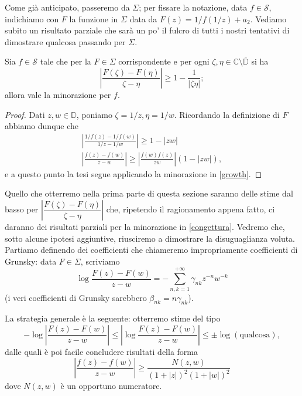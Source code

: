 Come già anticipato, passeremo da $\Sigma$; per fissare la notazione, data $f \in \mathcal{S}$, indichiamo con $F$ la funzione in $\Sigma$ data da $F(z)=1/f(1/z)+a_2$. Vediamo subito un risultato parziale che sarà un po' il fulcro di tutti i nostri tentativi di dimostrare qualcosa passando per $\Sigma$.

\begin{prop}
  Sia $f \in \mathcal{S}$ tale che per la $F \in \Sigma$ corrispondente e per ogni $\zeta,\eta \in \mathbb{C}\setminus\overline{\mathbb{D}}$ si ha
  $$\left|\frac{F(\zeta)-F(\eta)}{\zeta-\eta}\right| \ge 1-\frac{1}{|\zeta\eta|};$$
  allora vale la minorazione per $f$.
\end{prop}

\begin{proof}
  Dati $z,w \in \mathbb{D}$, poniamo $\zeta=1/z, \eta=1/w$. Ricordando la definizione di $F$ abbiamo dunque che
  \begin{gather*}
    \left|\frac{1/f(z)-1/f(w)}{1/z-1/w}\right| \ge 1-|zw| \\
    \left|\frac{f(z)-f(w)}{z-w}\right| \ge \left|\frac{f(w)f(z)}{zw}\right| (1-|zw|),
  \end{gather*}
  e a questo punto la tesi segue applicando la minorazione in \eqref{growth}.
\end{proof}

Quello che otterremo nella prima parte di questa sezione saranno delle stime dal basso per $\left|\dfrac{F(\zeta)-F(\eta)}{\zeta-\eta}\right|$ che, ripetendo il ragionamento appena fatto, ci daranno dei risultati parziali per la minorazione in \eqref{congettura}. Vedremo che, sotto alcune ipotesi aggiuntive, riusciremo a dimostrare la disuguaglianza voluta. \\

Partiamo definendo dei coefficienti che chiameremo impropriamente coefficienti di Grunsky: data $F \in \Sigma$, scriviamo
$$\log{\frac{F(z)-F(w)}{z-w}}=-\sum_{n,k=1}^{+\infty} \gamma_{nk}z^{-n}w^{-k}$$
(i veri coefficienti di Grunsky sarebbero $\beta_{nk}=n\gamma_{nk}$).

La strategia generale è la seguente: otterremo stime del tipo
$$-\log{\left|\frac{F(z)-F(w)}{z-w}\right|} \le \left|\log{\frac{F(z)-F(w)}{z-w}}\right| \le \pm \log(\text{qualcosa}),$$
dalle quali è poi facile concludere risultati della forma
$$\left|\frac{f(z)-f(w)}{z-w}\right| \ge \frac{N(z,w)}{(1+|z|)^2(1+|w|)^2}$$
dove $N(z,w)$ è un opportuno numeratore.
